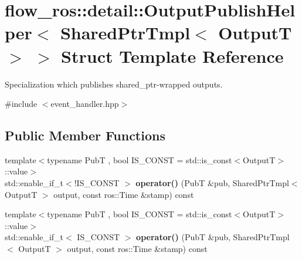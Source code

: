 \hypertarget{structflow__ros_1_1detail_1_1_output_publish_helper_3_01_shared_ptr_tmpl_3_01_output_t_01_4_01_4}{}\section{flow\+\_\+ros\+:\+:detail\+:\+:Output\+Publish\+Helper$<$ Shared\+Ptr\+Tmpl$<$ OutputT $>$ $>$ Struct Template Reference}
\label{structflow__ros_1_1detail_1_1_output_publish_helper_3_01_shared_ptr_tmpl_3_01_output_t_01_4_01_4}


Specialization which publishes shared\+\_\+ptr-\/wrapped outputs.  




{\ttfamily \#include $<$event\+\_\+handler.\+hpp$>$}

\subsection*{Public Member Functions}
\begin{DoxyCompactItemize}
\item 
\mbox{\label{structflow__ros_1_1detail_1_1_output_publish_helper_3_01_shared_ptr_tmpl_3_01_output_t_01_4_01_4_ad049e188dfca98b10dd1661e68046755}} 
{\footnotesize template$<$typename PubT , bool I\+S\+\_\+\+C\+O\+N\+ST = std\+::is\+\_\+const$<$\+Output\+T$>$\+::value$>$ }\\std\+::enable\+\_\+if\+\_\+t$<$!I\+S\+\_\+\+C\+O\+N\+ST $>$ {\bfseries operator()} (PubT \&pub, Shared\+Ptr\+Tmpl$<$ OutputT $>$ output, const ros\+::\+Time \&stamp) const
\item 
\mbox{\label{structflow__ros_1_1detail_1_1_output_publish_helper_3_01_shared_ptr_tmpl_3_01_output_t_01_4_01_4_a7fdd94ff1a1f62142007965d963c1ae3}} 
{\footnotesize template$<$typename PubT , bool I\+S\+\_\+\+C\+O\+N\+ST = std\+::is\+\_\+const$<$\+Output\+T$>$\+::value$>$ }\\std\+::enable\+\_\+if\+\_\+t$<$ I\+S\+\_\+\+C\+O\+N\+ST $>$ {\bfseries operator()} (PubT \&pub, Shared\+Ptr\+Tmpl$<$ OutputT $>$ output, const ros\+::\+Time \&stamp) const
\end{DoxyCompactItemize}


